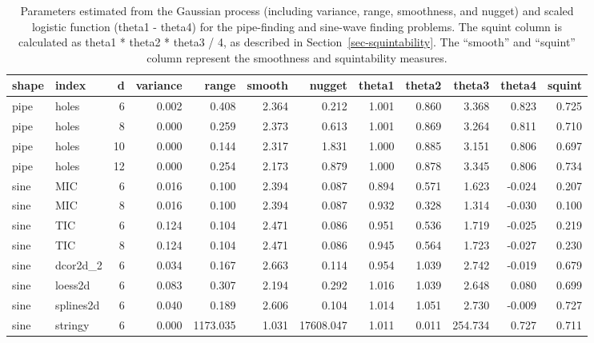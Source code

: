 \documentclass[
  number,
  preprint,
  3p]{elsarticle}
\begin{document}
\begin{longtable}[t]{|>{}ll>{}r|rrr>{}r|rrrr>{}r|}

\caption{\label{tbl-smoothness-squintability}Parameters estimated from
the Gaussian process (including variance, range, smoothness, and nugget)
and scaled logistic function (theta1 - theta4) for the pipe-finding and
sine-wave finding problems. The squint column is calculated as theta1 *
theta2 * theta3 / 4, as described in Section~\ref{sec-squintability}.
The ``smooth'' and ``squint'' column represent the smoothness and
squintability measures.}

\tabularnewline

\toprule
shape & index & d & variance & range & smooth & nugget & theta1 & theta2 & theta3 & theta4 & squint\\
\midrule
pipe & holes & 6 & 0.002 & 0.408 & 2.364 & 0.212 & 1.001 & 0.860 & 3.368 & 0.823 & 0.725\\
pipe & holes & 8 & 0.000 & 0.259 & 2.373 & 0.613 & 1.001 & 0.869 & 3.264 & 0.811 & 0.710\\
pipe & holes & 10 & 0.000 & 0.144 & 2.317 & 1.831 & 1.000 & 0.885 & 3.151 & 0.806 & 0.697\\
pipe & holes & 12 & 0.000 & 0.254 & 2.173 & 0.879 & 1.000 & 0.878 & 3.345 & 0.806 & 0.734\\
sine & MIC & 6 & 0.016 & 0.100 & 2.394 & 0.087 & 0.894 & 0.571 & 1.623 & -0.024 & 0.207\\
\addlinespace
sine & MIC & 8 & 0.016 & 0.100 & 2.394 & 0.087 & 0.932 & 0.328 & 1.314 & -0.030 & 0.100\\
sine & TIC & 6 & 0.124 & 0.104 & 2.471 & 0.086 & 0.951 & 0.536 & 1.719 & -0.025 & 0.219\\
sine & TIC & 8 & 0.124 & 0.104 & 2.471 & 0.086 & 0.945 & 0.564 & 1.723 & -0.027 & 0.230\\
sine & dcor2d\_2 & 6 & 0.034 & 0.167 & 2.663 & 0.114 & 0.954 & 1.039 & 2.742 & -0.019 & 0.679\\
sine & loess2d & 6 & 0.083 & 0.307 & 2.194 & 0.292 & 1.016 & 1.039 & 2.648 & 0.080 & 0.699\\
\addlinespace
sine & splines2d & 6 & 0.040 & 0.189 & 2.606 & 0.104 & 1.014 & 1.051 & 2.730 & -0.009 & 0.727\\
sine & stringy & 6 & 0.000 & 1173.035 & 1.031 & 17608.047 & 1.011 & 0.011 & 254.734 & 0.727 & 0.711\\
\bottomrule

\end{longtable}
\end{document}
